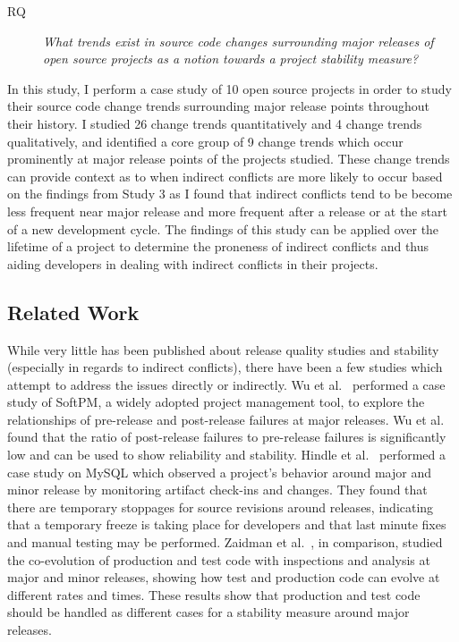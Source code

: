 \begin{description}
        \item[RQ] \textit{What trends exist in source code changes surrounding major releases of open 
        source projects as a notion towards a project stability measure?}
\end{description}

In this study, I perform a case study of 10 open source projects in order to study their source code change trends surrounding major release points
throughout their history. I studied 26 change trends quantitatively and 4 change trends qualitatively, and identified a core group of 9 change trends which occur
prominently at major release points of the projects studied. These change trends can provide context as to when indirect conflicts are more likely
to occur based on the findings from Study 3 as I found that indirect conflicts tend to be become less frequent near major release and more
frequent after a release or at the start of a new development cycle. The findings of this study can be applied over the lifetime of a project
to determine the proneness of indirect conflicts and thus aiding developers in dealing with indirect conflicts in their projects.

\subsection{Related Work}
\label{sec:rel}
While very little has been published about release quality studies and stability (especially in regards to
indirect conflicts), there have been a few studies which attempt to address the issues directly
or indirectly. Wu et al.~\cite{Wu:2008:QAF} performed a case study of SoftPM, a widely adopted project management tool, to explore the relationships of
pre-release and post-release failures at major releases. Wu et al. found that the ratio of post-release failures to pre-release failures is significantly low
and can be used to show reliability and stability. Hindle et al.~\cite{Hindle:2007:RPD} performed a case study on MySQL which observed a project's behavior
around major and minor release by monitoring artifact check-ins and changes. They found that there are temporary stoppages for source revisions around releases,
indicating that a temporary freeze is taking place for developers and that last minute fixes and manual testing may be performed.
Zaidman et al.~\cite{Zaidman:2011:SCP}, in comparison, studied the co-evolution of production and test code with inspections and analysis
at major and minor releases, showing how test and production code can evolve at different rates and times. These results show that production
and test code should be handled as different cases for a stability measure around major releases. 

